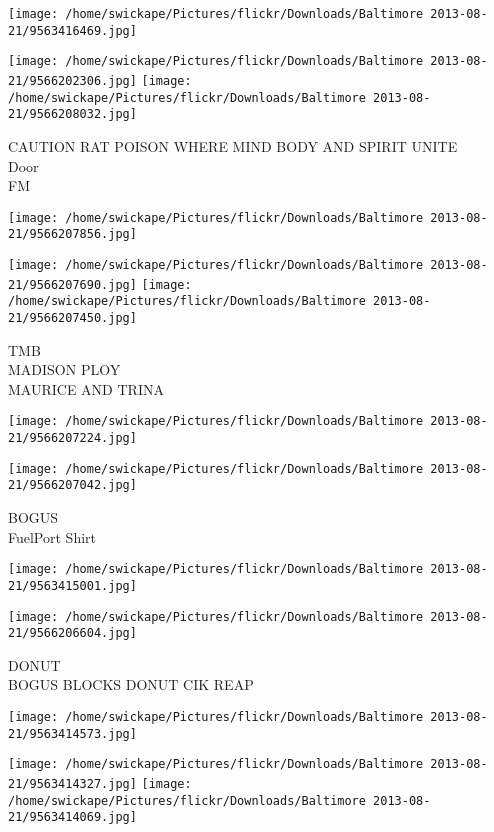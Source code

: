 \documentclass[10pt,letterpaper]{article}
\begin{document}
\texttt{[image: /home/swickape/Pictures/flickr/Downloads/Baltimore 2013-08-21/9563416469.jpg]}

\vspace{0.25in}
\texttt{[image: /home/swickape/Pictures/flickr/Downloads/Baltimore 2013-08-21/9566202306.jpg]}
\texttt{[image: /home/swickape/Pictures/flickr/Downloads/Baltimore 2013-08-21/9566208032.jpg]}

CAUTION RAT POISON WHERE MIND BODY AND SPIRIT UNITE\\
Door\\
FM
\pagebreak

\texttt{[image: /home/swickape/Pictures/flickr/Downloads/Baltimore 2013-08-21/9566207856.jpg]}

\vspace{0.25in}
\texttt{[image: /home/swickape/Pictures/flickr/Downloads/Baltimore 2013-08-21/9566207690.jpg]}
\texttt{[image: /home/swickape/Pictures/flickr/Downloads/Baltimore 2013-08-21/9566207450.jpg]}

TMB\\
MADISON PLOY\\
MAURICE AND TRINA
\pagebreak

\texttt{[image: /home/swickape/Pictures/flickr/Downloads/Baltimore 2013-08-21/9566207224.jpg]}

\vspace{0.25in}
\texttt{[image: /home/swickape/Pictures/flickr/Downloads/Baltimore 2013-08-21/9566207042.jpg]}

BOGUS\\
FuelPort Shirt
\pagebreak

\texttt{[image: /home/swickape/Pictures/flickr/Downloads/Baltimore 2013-08-21/9563415001.jpg]}

\vspace{0.25in}
\texttt{[image: /home/swickape/Pictures/flickr/Downloads/Baltimore 2013-08-21/9566206604.jpg]}

DONUT\\
BOGUS BLOCKS DONUT CIK REAP
\pagebreak

\texttt{[image: /home/swickape/Pictures/flickr/Downloads/Baltimore 2013-08-21/9563414573.jpg]}

\vspace{0.25in}
\texttt{[image: /home/swickape/Pictures/flickr/Downloads/Baltimore 2013-08-21/9563414327.jpg]}
\texttt{[image: /home/swickape/Pictures/flickr/Downloads/Baltimore 2013-08-21/9563414069.jpg]}
\end{document}
